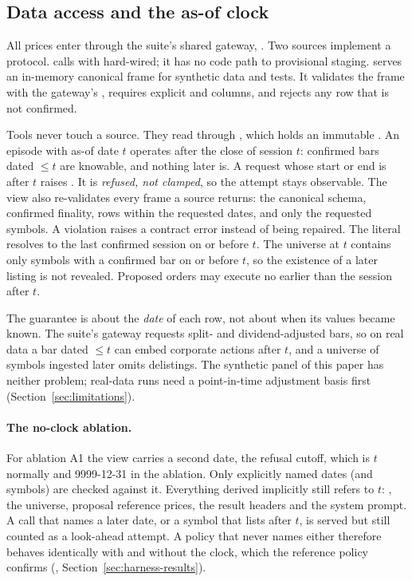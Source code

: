\subsection{Data access and the as-of clock}
\label{sec:clock}

All prices enter through the suite's shared gateway, .
Two sources implement a  protocol.  calls
 with  hard-wired;
it has no code path to provisional staging.  serves an
in-memory canonical frame for synthetic data and tests. It validates the frame
with the gateway's , requires explicit  and
 columns, and rejects any row that is not confirmed.

Tools never touch a source. They read through , which
holds an immutable . An episode with as-of date $t$ operates
after the close of session $t$: confirmed bars dated $\le t$ are knowable, and
nothing later is. A request whose start or end is after $t$ raises
. It is \emph{refused, not clamped}, so the attempt
stays observable. The view also re-validates every frame a source returns: the
canonical schema, confirmed finality, rows within the requested dates, and
only the requested symbols. A violation raises a contract error instead of
being repaired. The literal  resolves to the last confirmed
session on or before $t$. The universe at $t$ contains only symbols with a
confirmed bar on or before $t$, so the existence of a later listing is not
revealed. Proposed orders may execute no earlier than the session after $t$.

The guarantee is about the \emph{date} of each row, not about when its values
became known. The suite's gateway requests split- and dividend-adjusted bars,
so on real data a bar dated $\le t$ can embed corporate actions after $t$, and
a universe of symbols ingested later omits delistings. The synthetic panel of
this paper has neither problem; real-data runs need a point-in-time
adjustment basis first (Section~\ref{sec:limitations}).

\paragraph{The no-clock ablation.} For ablation A1 the view carries a second
date, the refusal cutoff, which is $t$ normally and 9999-12-31 in the
ablation. Only explicitly named dates (and symbols) are checked against it.
Everything derived implicitly still refers to $t$: , the
universe, proposal reference prices, the result headers and the system prompt.
A call that names a later date, or a symbol that lists after $t$, is served
but still counted as a look-ahead attempt. A policy that never names either
therefore behaves identically with and without the clock, which the reference
policy confirms (, Section~\ref{sec:harness-results}).

